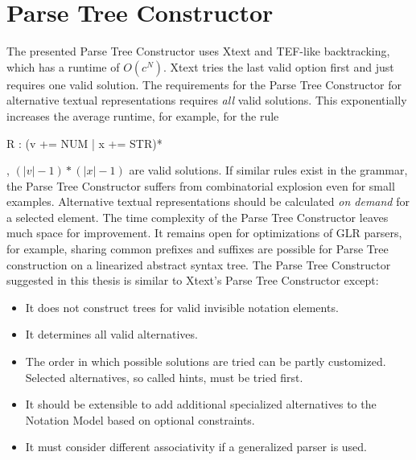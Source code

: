 \section{Parse Tree Constructor}
The presented Parse Tree Constructor uses Xtext and TEF-like backtracking, which has a runtime of $O(c^N)$. Xtext tries the last valid option first and just requires one valid solution. The requirements for the Parse Tree Constructor for alternative textual representations requires \emph{all} valid solutions. This exponentially increases the average runtime, for example, for the rule
\begin{xtxt}
R : (v += NUM | x += STR)*
\end{xtxt}, $( |v| - 1 ) * ( |x| - 1)$ are valid solutions. If similar rules exist in the grammar, the Parse Tree Constructor suffers from combinatorial explosion even for small examples.  Alternative textual representations should be calculated \emph{on demand} for a selected element. The time complexity of the Parse Tree Constructor leaves much space for improvement. It remains open for optimizations of GLR parsers, for example, sharing common prefixes and suffixes are possible for Parse Tree construction on a linearized abstract syntax tree. The Parse Tree Constructor suggested in this thesis is similar to Xtext's Parse Tree Constructor except:
\begin{itemize}
	\item It does not construct trees for valid invisible notation elements.
	\item It determines all valid alternatives.
	\item The order in which possible solutions are tried can be partly customized. Selected alternatives, so called hints, must be tried first.
	\item It should be extensible to add additional specialized alternatives to the Notation Model based on optional constraints.
	\item It must consider different associativity if a generalized parser is used.
\end{itemize}

